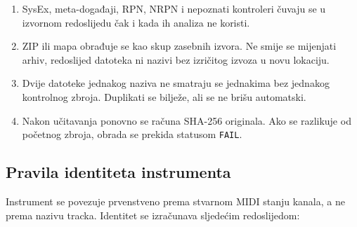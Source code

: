 \documentclass[11pt]{article}
\begin{document}
\begin{enumerate}[label=L\arabic*.]
    \item SysEx, meta-događaji, RPN, NRPN i nepoznati kontroleri čuvaju se u
    izvornom redoslijedu čak i kada ih analiza ne koristi.

    \item ZIP ili mapa obrađuje se kao skup zasebnih izvora. Ne smije se
    mijenjati arhiv, redoslijed datoteka ni nazivi bez izričitog izvoza u novu
    lokaciju.

    \item Dvije datoteke jednakog naziva ne smatraju se jednakima bez jednakog
    kontrolnog zbroja. Duplikati se bilježe, ali se ne brišu automatski.

    \item Nakon učitavanja ponovno se računa SHA-256 originala. Ako se razlikuje
    od početnog zbroja, obrada se prekida statusom \texttt{FAIL}.
\end{enumerate}

\subsection{Pravila identiteta instrumenta}

Instrument se povezuje prvenstveno prema stvarnom MIDI stanju kanala, a ne
prema nazivu tracka. Identitet se izračunava sljedećim redoslijedom:
\end{document}

